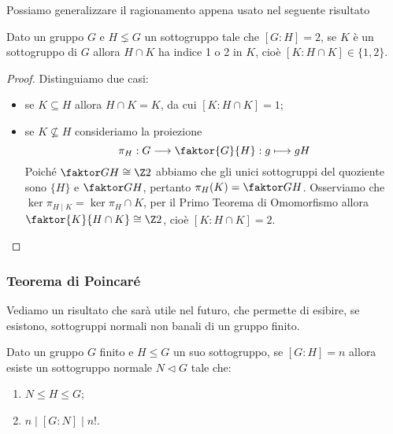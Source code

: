 \documentclass[11pt]{scrartcl}
\begin{document}
Possiamo generalizzare il ragionamento appena usato nel seguente risultato

\begin{proposition}
    \label{prop1.49}
    Dato un gruppo $G$ e $H\lneq G$ un sottogruppo tale che $[G:H] = 2$, se
    $K$ è un sottogruppo di $G$ allora $H\cap K$ ha indice 1 o 2 in $K$,
    cioè $[K:H\cap K] \in \{1, 2\}$.
\end{proposition}

\begin{proof}
    Distinguiamo due casi:
    \begin{itemize}
        \item se $K \subseteq H$ allora $H \cap K = K$, da cui $[K:H\cap K] = 1$;
        \item se $K \nsubseteq H$ consideriamo la proiezione 
        \[
            \pi_H: G\longrightarrow \faktor{G}{H} :g \longmapsto gH
        \]
        Poiché $\faktor G H \cong \Z2$ abbiamo che gli unici sottogruppi 
        del quoziente sono $\{H\}$ e $\faktor G H$, pertanto 
        $\pi_H(K) = \faktor G H$. Osserviamo che $\ker\pi_{H\mid K}
        = \ker \pi_H \cap K$, per il Primo Teorema di Omomorfismo allora 
        $\faktor{K}{H\cap K} \cong \Z2$, cioè $[K:H\cap K] = 2$.
    \end{itemize}
\end{proof}

\subsubsection{Teorema di Poincaré}

Vediamo un risultato che sarà utile nel futuro, che permette di esibire,
se esistono, sottogruppi normali non banali di un gruppo finito.

\begin{theorem}
    \label{teorema1.50}
    Dato un gruppo $G$ finito e $H\leqslant G$ un suo sottogruppo, 
    se $[G:H] = n$ allora esiste un sottogruppo normale $N\triangleleft G$ 
    tale che:
    \begin{enumerate}[(1)]
        \item $N\leqslant H \leqslant G$;
        \item $n \mid [G:N] \mid n!$.
    \end{enumerate}
\end{theorem}
\end{document}
